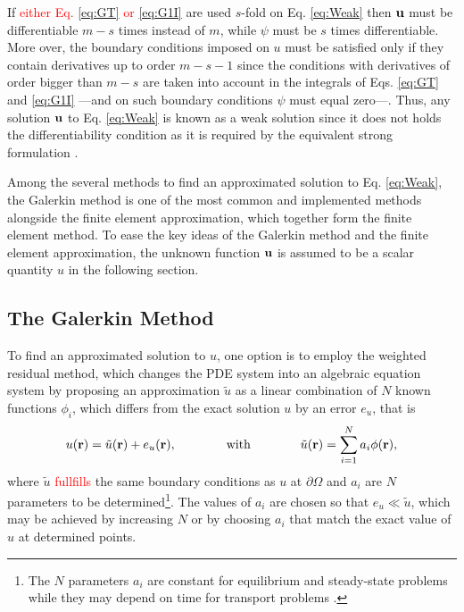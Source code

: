 %
If  \textcolor{red}{either Eq. \eqref{eq:GT} or \eqref{eq:G1I}} are used $s$-fold on Eq. \eqref{eq:Weak} then $\vb{u}$ must be differentiable $m-s$ times instead of $m$, while $\psi$ must be $s$ times differentiable. More over, the boundary conditions imposed on $u$ must be satisfied only if they contain  derivatives up to order $m-s-1$ since the conditions with derivatives of order bigger than $m-s$ are taken into account in the integrals of Eqs. \eqref{eq:GT} and \eqref{eq:G1I} ---and on such boundary conditions $\psi$ must equal zero---. Thus, any solution $\vb{u}$ to Eq. \eqref{eq:Weak} is known as a weak solution  since it does not holds the differentiability condition as it is required by the equivalent strong formulation \cite{dhatt_finite_2012}.

Among the several methods to find an approximated solution to Eq. \eqref{eq:Weak}, the Galerkin method is one of the most common and implemented methods alongside the finite element approximation, which together form the finite element method. To ease the key ideas of the Galerkin method and the finite element approximation, the unknown function $\vb{u}$ is assumed to be a scalar quantity $u$ in the following section.

    \subsection{The Galerkin Method}

    To find an approximated solution to $u$, one option is to employ the weighted residual method, which changes the PDE system into an algebraic equation system by proposing an approximation  $\tilde{u}$ as a linear combination of $N$ known functions  $\phi_i$, which differs from the exact solution $u$ by an error $e_{u}$, that is \cite{dhatt_finite_2012,larson_finite_2013,fletcher_computational_1984}
     \begin{align}
        {u}(\vb{r}) = \tilde{{u}}(\vb{r}) + e_{{u}}(\vb{r}),
            \qquad\qquad
            \text{with}
            \qquad\qquad
        \tilde{{u}}(\vb{r}) = \sum_{i = 1}^{N} {a}_i\phi(\vb{r}),
     \label{eq:uapprox}
     \end{align}
     where $\tilde{{u}}$ \textcolor{red}{fullfills} the same boundary conditions as ${u}$ at $\partial\Omega$ and ${a}_i$ are $N$ parameters to be determined\footnote{The $N$ parameters ${a}_i$ are constant for equilibrium and steady-state problems while they may depend on time for transport problems \cite{dhatt_finite_2012}.}. The values of ${a}_i$ are chosen so that $e_{{u}}\ll  \tilde{u} $, which may be achieved by increasing $N$ or by choosing ${a}_i$ that match the exact value of ${u}$ at determined points.


